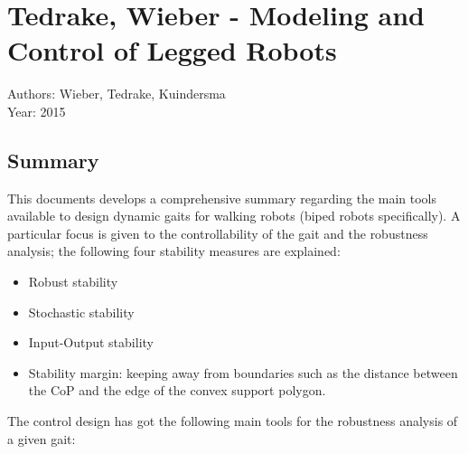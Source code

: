 \section{Tedrake, Wieber - Modeling and Control of Legged Robots \cite{Tedrake1}}
Authors: Wieber, Tedrake, Kuindersma\\
Year: 2015\\
\subsection*{Summary}
This documents develops a comprehensive summary regarding the main tools available to design dynamic gaits for walking robots (biped robots specifically). A particular focus is given to the controllability of the gait and the robustness analysis; the following four stability measures are explained:
\begin{itemize}
\item Robust stability
\item Stochastic stability
\item Input-Output stability
\item Stability margin: keeping away from boundaries such as the distance between the CoP and the edge of the convex support polygon.
\end{itemize}
The control design has got the following main tools for the robustness analysis of a given gait:
